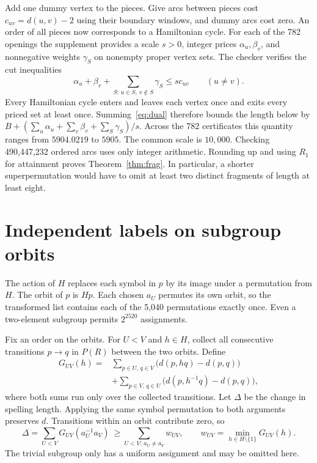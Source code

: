 \documentclass[11pt]{article}
\begin{document}
Add one dummy vertex to the pieces. Give arcs between pieces cost $c_{uv}=d(u,v)-2$ using their boundary windows, and dummy arcs cost zero. An order of all pieces now corresponds to a Hamiltonian cycle. For each of the 782 openings the supplement provides a scale $s>0$, integer prices $\alpha_u,\beta_v$, and nonnegative weights $\gamma_S$ on nonempty proper vertex sets. The checker verifies the cut inequalities \cite{dfj}
\begin{equation}
 \alpha_u+\beta_v+\sum_{S:\,u\in S,\ v\notin S}\gamma_S\leq s c_{uv}
 \qquad(u\ne v).\label{eq:dual}
\end{equation}
Every Hamiltonian cycle enters and leaves each vertex once and exits every priced set at least once. Summing~\eqref{eq:dual} therefore bounds the length below by
$B+(\sum_u\alpha_u+\sum_v\beta_v+\sum_S\gamma_S)/s$.
Across the 782 certificates this quantity ranges from $5904.0219$ to $5905$. The common scale is $10{,}000$. Checking 490,447,232 ordered arcs uses only integer arithmetic. Rounding up and using $R_1$ for attainment proves Theorem~\ref{thm:frag}. In particular, a shorter superpermutation would have to omit at least two distinct fragments of length at least eight.
\newpage
\section{Independent labels on subgroup orbits}
The action of $H$ replaces each symbol in $p$ by its image under a permutation from $H$. The orbit of $p$ is $Hp$. Each chosen $a_U$ permutes its own orbit, so the transformed list contains each of the 5,040 permutations exactly once. Even a two-element subgroup permits $2^{2520}$ assignments.

Fix an order on the orbits. For $U<V$ and $h\in H$, collect all consecutive transitions $p\to q$ in $P(R)$ between the two orbits. Define
\[
\begin{split}
G_{UV}(h)={}&\sum_{p\in U,\,q\in V}\bigl(d(p,hq)-d(p,q)\bigr)\\
 &+\sum_{p\in V,\,q\in U}\bigl(d(p,h^{-1}q)-d(p,q)\bigr),
\end{split}
\]
where both sums run only over the collected transitions. Let $\Delta$ be the change in spelling length. Applying the same symbol permutation to both arguments preserves $d$. Transitions within an orbit contribute zero, so
\[
\Delta=\sum_{U<V}G_{UV}(a_U^{-1}a_V)
\ \geq\!\sum_{U<V:\,a_U\ne a_V}w_{UV},\qquad
w_{UV}=\min_{h\in H\setminus\{1\}}G_{UV}(h).
\]
The trivial subgroup only has a uniform assignment and may be omitted here.
\end{document}
